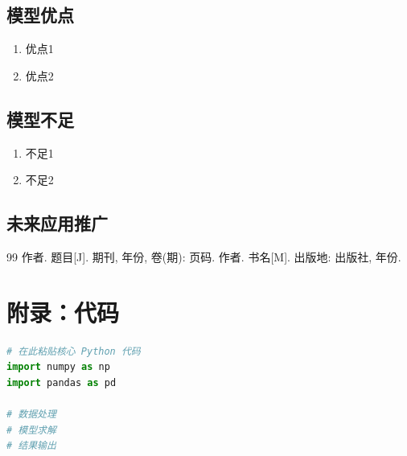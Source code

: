 \subsection{模型优点}
\begin{enumerate}[label=\arabic*.]
  \item 优点1
  \item 优点2
\end{enumerate}

\subsection{模型不足}
\begin{enumerate}[label=\arabic*.]
  \item 不足1
  \item 不足2
\end{enumerate}

\subsection{未来应用推广}

\newpage
\begin{thebibliography}{99}
   作者. 题目[J]. 期刊, 年份, 卷(期): 页码.
   作者. 书名[M]. 出版地: 出版社, 年份.
\end{thebibliography}

\newpage
\appendix
\section{附录：代码}

\begin{lstlisting}[language=Python, caption={主要代码}]
# 在此粘贴核心 Python 代码
import numpy as np
import pandas as pd

# 数据处理
# 模型求解
# 结果输出
\end{lstlisting}


